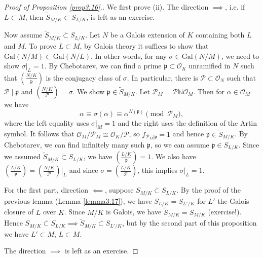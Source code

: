 \documentclass{article}
\theoremstyle{definition}
\begin{document}
\begin{proof}[Proof of Proposition \ref{prop3.16}.]
    We first prove (ii). The direction $\implies $, i.e. if $L \subset M$, then $\widetilde{S}_{M/K} \stackrel{\cdot }{\subset } S_{L/K}$, is left as an exercise.
    \vspace{1mm}
     
    Now assume $\widetilde{S}_{M/K} \stackrel{\cdot }{\subset } S_{L/K}$. Let $N$ be a Galois extension of $K$ containing both $L$ and $M$. To prove $L \subset M$, by Galois theory it suffices to show that $\text{Gal}(N/M) \subset \text{Gal}(N/L)$. In other words, for any $\sigma \in \text{Gal}(N/M)$, we need to show $\sigma|_L = 1$. By Chebotarev, we can find a prime $\mathfrak{p} \subset \mathcal{O}_K$ unramified in $N$ such that $\left(\frac{N/K}{\mathfrak{p}}\right)$ is the conjugacy class of $\sigma$. In particular, there is $\mathcal{P} \subset \mathcal{O}_N$ such that $\mathcal{P} \mid \mathfrak{p}$ and $\left(\frac{N/K}{\mathcal{P}}\right) = \sigma$. We show $\mathfrak{p} \in \widetilde{S}_{M/K}$. Let $\mathcal{P}_M = \mathcal{P} \mathbb{N} \mathcal{O}_M$. Then for $\alpha \in \mathcal{O}_M$ we have $$\alpha \equiv \sigma(\alpha) \equiv \alpha^{N(\mathfrak{p})} \pmod{\mathcal{P}_M},$$ where the left equality uses $\sigma|_M=1$ and the right uses the definition of the Artin symbol. It follows that $\mathcal{O}_M/\mathcal{P}_M \cong \mathcal{O}_K/\mathcal{P}$, so $f_{\mathcal{P}_M|\mathfrak{p}}=1$ and hence $\mathfrak{p} \in \widetilde{S}_{M/K}$. By Chebotarev, we can find infinitely many such $\mathfrak{p}$, so we can assume $\mathfrak{p} \in S_{L/K}$. Since we assumed $\widetilde{S}_{M/K} \stackrel{\cdot }{\subset } S_{L/K}$, we have $\left(\frac{L/K}{\mathfrak{p}}\right)=1$. We also have $\left(\frac{L/K}{\mathfrak{p}}\right) = \left(\frac{N/K}{\mathcal{P}}\right)|_L$ and since $\sigma = \left(\frac{L/K}{\mathcal{P}}\right)$, this implies $\sigma|_L=1$.
    \vspace{1mm}
     
    For the first part, direction $\impliedby$, suppose $S_{M/K} \stackrel{\cdot }{\subset } S_{L/K}$. By the proof of the previous lemma (Lemma \ref{lemma3.17}), we have $S_{L/K} = S_{L'/K}$ for $L'$ the Galois closure of $L$ over $K$. Since $M/K$ is Galois, we have $\widetilde{S}_{M/K} = S_{M/K}$ (exercise!). Hence $S_{M/K} \stackrel{\cdot }{\subset } S_{L/K} \implies \widetilde{S}_{M/K} \stackrel{\cdot }{\subset } S_{L'/K}$, but by the second part of this proposition we have $L' \subset M$, $L \subset M$.
    \vspace{1mm}
     
    The direction $\implies$ is left as an exercise.
\end{proof}
\end{document}
